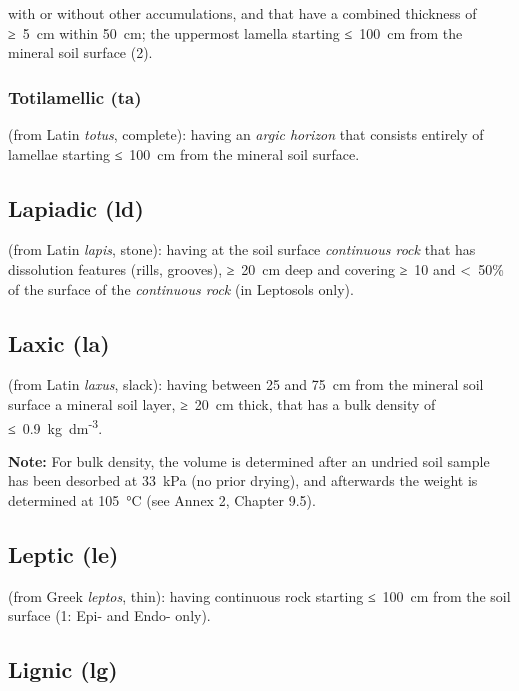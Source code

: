 \documentclass[
  letterpaper,
  DIV=11,
  numbers=noendperiod]{scrreprt}
\begin{document}
with or without other accumulations, and that have a combined thickness
of ≥~5~cm within 50~cm; the uppermost lamella starting ≤~100~cm from the
mineral soil surface (2).

\hypertarget{totilamellic-ta}{%
\subsubsection{Totilamellic (ta)}\label{totilamellic-ta}}

(from Latin \emph{totus}, complete): having an \emph{argic horizon} that
consists entirely of lamellae starting ≤~100~cm from the mineral soil
surface.

\hypertarget{lapiadic-ld}{%
\subsection{Lapiadic (ld)}\label{lapiadic-ld}}

(from Latin \emph{lapis}, stone): having at the soil surface
\emph{continuous rock} that has dissolution features (rills, grooves),
≥~20~cm deep and covering ≥~10 and \textless~50\% of the surface of the
\emph{continuous rock} (in Leptosols only).

\hypertarget{laxic-la}{%
\subsection{Laxic (la)}\label{laxic-la}}

(from Latin \emph{laxus}, slack): having between 25 and 75~cm from the
mineral soil surface a mineral soil layer, ≥~20~cm thick, that has a
bulk density of ≤~0.9~kg~dm\textsuperscript{-3}.

\textbf{Note:} For bulk density, the volume is determined after an
undried soil sample has been desorbed at 33~kPa (no prior drying), and
afterwards the weight is determined at 105~°C (see Annex 2, Chapter
9.5).

\hypertarget{leptic-le}{%
\subsection{Leptic (le)}\label{leptic-le}}

(from Greek \emph{leptos}, thin): having continuous rock starting
≤~100~cm from the soil surface (1: Epi- and Endo- only).

\hypertarget{lignic-lg}{%
\subsection{Lignic (lg)}\label{lignic-lg}}
\end{document}
